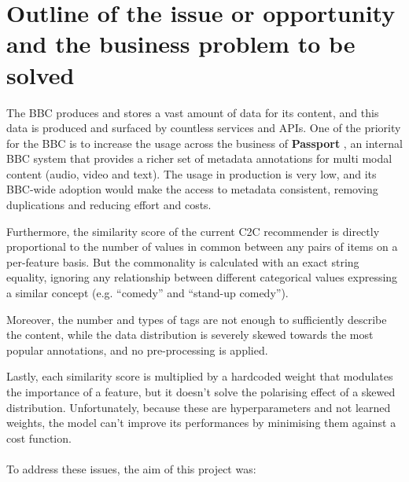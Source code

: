 
\section{Outline of the issue or opportunity and the business problem to be solved}

The BBC produces and stores a vast amount of data for its content, and this data is produced and surfaced by countless services and APIs.
One of the priority for the BBC is to increase the usage across the business of \textbf{Passport} \cite{BBC:PassportMetadata}, an internal BBC
system that provides a richer set of metadata annotations for multi modal content (audio, video and text).
The usage in production is very low, and its BBC-wide adoption would make the access to metadata consistent,
removing duplications and reducing effort and costs.

Furthermore, the similarity score of the current C2C recommender is directly proportional to the number of values in common between any pairs of items
on a per-feature basis. But the commonality is calculated with an exact string equality, ignoring any relationship between different
categorical values expressing a similar concept (e.g. ``comedy'' and ``stand-up comedy'').

Moreover, the number and types of tags are not enough to sufficiently
describe the content, while the data distribution is severely skewed towards the most popular annotations, and no pre-processing
is applied.

Lastly, each similarity score is multiplied by a hardcoded weight that modulates the importance of a feature, but it doesn't solve
the polarising effect of a skewed distribution. Unfortunately, because these are hyperparameters and not learned weights, the model can't improve
its performances by minimising them against a cost function.
\\ \\
To address these issues, the aim of this project was:

